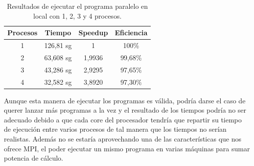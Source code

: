 \documentclass{article}
\begin{document}
\begin{table}[h]
	\begin{center}
		\caption{Resultados de ejecutar el programa paralelo en local con 1, 2, 3 y 4 procesos.}
		\begin{tabular}{|c|c|c|c|}
\hline
\textbf{Procesos} &
\textbf{Tiempo} &
\textbf{Speedup} &
\textbf{Eficiencia} \\ \hline
\hline
1 & 126,81 sg & 1          & 100\% \\ \hline
2 & 63,608 sg & 1,9936 & 99,68\% \\ \hline
3 & 43,286 sg & 2,9295 & 97,65\% \\ \hline
4 & 32,582 sg & 3,8920 & 97,30\% \\ \hline
		\end{tabular}
		\label{tab:resultadosLocal}
	\end{center}
\end{table}

	Aunque esta manera de ejecutar los programas es válida, podría darse el caso de querer lanzar más programas a la vez y el resultado de los tiempos podría no ser adecuado debido a que cada core del procesador tendría que repartir su tiempo de ejecución entre varios procesos de tal manera que los tiempos no serían realistas. Además no se estaría aprovechando una de las características que nos ofrece MPI, el poder ejecutar un mismo programa en varias máquinas para sumar potencia de cálculo.


\clearpage

{\setlength{\parskip}{0mm} \listoftables } %
{\setlength{\parskip}{0mm} \listoffigures} %
\end{document}
